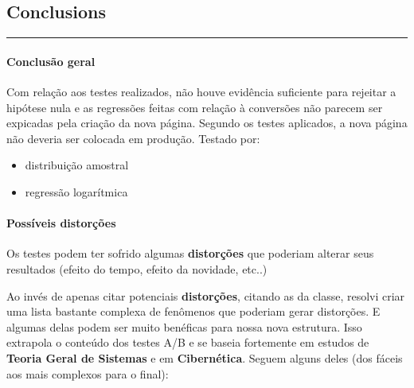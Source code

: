 \documentclass[11pt]{article}
\begin{document}
    \hypertarget{conclusions}{%
\subsection{Conclusions}\label{conclusions}}

\begin{center}\rule{0.5\linewidth}{\linethickness}\end{center}

    \hypertarget{conclusuxe3o-geral}{%
\paragraph{Conclusão geral}\label{conclusuxe3o-geral}}

Com relação aos testes realizados, não houve evidência suficiente para
rejeitar a hipótese nula e as regressões feitas com relação à conversões
não parecem ser expicadas pela criação da nova página. Segundo os testes
aplicados, a nova página não deveria ser colocada em produção. Testado
por:

\begin{itemize}
\item
  distribuição amostral
\item
  regressão logarítmica
\end{itemize}

\hypertarget{possuxedveis-distoruxe7uxf5es}{%
\paragraph{Possíveis distorções}\label{possuxedveis-distoruxe7uxf5es}}

Os testes podem ter sofrido algumas \textbf{distorções} que poderiam
alterar seus resultados (efeito do tempo, efeito da novidade, etc..)

Ao invés de apenas citar potenciais \textbf{distorções}, citando as da
classe, resolvi criar uma lista bastante complexa de fenômenos que
poderiam gerar distorções. E algumas delas podem ser muito benéficas
para nossa nova estrutura. Isso extrapola o conteúdo dos testes A/B e se
baseia fortemente em estudos de \textbf{Teoria Geral de Sistemas} e em
\textbf{Cibernética}. Seguem alguns deles (dos fáceis aos mais complexos
para o final):
\end{document}
